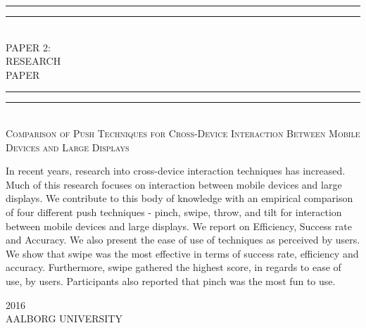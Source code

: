 
\begin{dummy}
\textheight
\centering
\vspace*{\baselineskip}
\rule{\textwidth}{1.6pt}\vspace*{-\baselineskip}\vspace*{2pt}
\rule{\textwidth}{0.4pt}\\[\baselineskip]
{\LARGE PAPER 2: \\ RESEARCH \\[0.3\baselineskip] PAPER}\\[0.2\baselineskip]
\rule{\textwidth}{0.4pt}\vspace*{-\baselineskip}\vspace{3.2pt}
\rule{\textwidth}{1.6pt}\\[\baselineskip]
\scshape
{ \large Comparison of Push Techniques for Cross-Device Interaction Between Mobile Devices and Large Displays } \par
\vspace*{2\baselineskip}
\vspace*{2\baselineskip}
\vspace*{2\baselineskip}
\vspace*{2\baselineskip}



\begin{newab}
	{In recent years, research into cross-device interaction techniques has increased. Much of this research focuses on interaction between mobile devices and large displays. We contribute to this body of knowledge with an empirical comparison of four different push techniques - pinch, swipe, throw,  and tilt for interaction between mobile devices and large displays. We report on Efficiency, Success rate and Accuracy. We also present the ease of use of techniques as perceived by users. We show that swipe was the most effective in terms of success rate, efficiency and accuracy. Furthermore, swipe gathered the highest score, in regards to ease of use, by users. Participants also reported that pinch was the most fun to use.}\par
\end{newab}

	\vspace*{2\baselineskip}
	\vspace*{2\baselineskip}
	\vspace*{2\baselineskip}
	\vspace*{2\baselineskip}
{\scshape 2016} \\
{\large AALBORG UNIVERSITY}\par

\end{dummy}